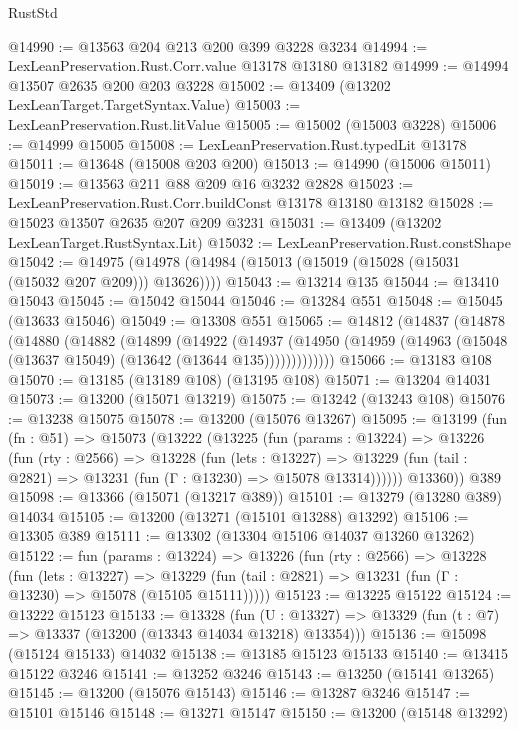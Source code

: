\begin{lexlean}{RustStd}
\begin{coremodule}
@14990 := @13563 @204 @213 @200 @399 @3228 @3234
@14994 := LexLeanPreservation.Rust.Corr.value @13178 @13180 @13182
@14999 := @14994 @13507 @2635 @200 @203 @3228
@15002 := @13409 (@13202 LexLeanTarget.TargetSyntax.Value)
@15003 := LexLeanPreservation.Rust.litValue
@15005 := @15002 (@15003 @3228)
@15006 := @14999 @15005
@15008 := LexLeanPreservation.Rust.typedLit @13178
@15011 := @13648 (@15008 @203 @200)
@15013 := @14990 (@15006 @15011)
@15019 := @13563 @211 @88 @209 @16 @3232 @2828
@15023 := LexLeanPreservation.Rust.Corr.buildConst @13178 @13180 @13182
@15028 := @15023 @13507 @2635 @207 @209 @3231
@15031 := @13409 (@13202 LexLeanTarget.RustSyntax.Lit)
@15032 := LexLeanPreservation.Rust.constShape
@15042 := @14975 (@14978 (@14984 (@15013 (@15019 (@15028 (@15031 (@15032 @207 @209))) @13626))))
@15043 := @13214 @135
@15044 := @13410 @15043
@15045 := @15042 @15044
@15046 := @13284 @551
@15048 := @15045 (@13633 @15046)
@15049 := @13308 @551
@15065 := @14812
    (@14837
      (@14878
        (@14880
          (@14882
            (@14899
              (@14922
                (@14937
                  (@14950 (@14959 (@14963 (@15048 (@13637 @15049) (@13642 (@13644 @135)))))))))))))
@15066 := @13183 @108
@15070 := @13185 (@13189 @108) (@13195 @108)
@15071 := @13204 @14031
@15073 := @13200 (@15071 @13219)
@15075 := @13242 (@13243 @108)
@15076 := @13238 @15075
@15078 := @13200 (@15076 @13267)
@15095 := @13199
    (fun (fn : @51) =>
    @15073
      (@13222
        (@13225
          (fun (params : @13224) =>
          @13226
            (fun (rty : @2566) =>
            @13228
              (fun (lets : @13227) =>
              @13229 (fun (tail : @2821) => @13231 (fun (Γ : @13230) => @15078 @13314))))))
        @13360))
    @389
@15098 := @13366 (@15071 (@13217 @389))
@15101 := @13279 (@13280 @389) @14034
@15105 := @13200 (@13271 (@15101 @13288) @13292)
@15106 := @13305 @389
@15111 := @13302 (@13304 @15106 @14037 @13260 @13262)
@15122 := fun (params : @13224) =>
  @13226
    (fun (rty : @2566) =>
    @13228
      (fun (lets : @13227) =>
      @13229 (fun (tail : @2821) => @13231 (fun (Γ : @13230) => @15078 (@15105 @15111)))))
@15123 := @13225 @15122
@15124 := @13222 @15123
@15133 := @13328
    (fun (U : @13327) => @13329 (fun (t : @7) => @13337 (@13200 (@13343 @14034 @13218) @13354)))
@15136 := @15098 (@15124 @15133) @14032
@15138 := @13185 @15123 @15133
@15140 := @13415 @15122 @3246
@15141 := @13252 @3246
@15143 := @13250 (@15141 @13265)
@15145 := @13200 (@15076 @15143)
@15146 := @13287 @3246
@15147 := @15101 @15146
@15148 := @13271 @15147
@15150 := @13200 (@15148 @13292)

\end{coremodule}
\end{lexlean}
